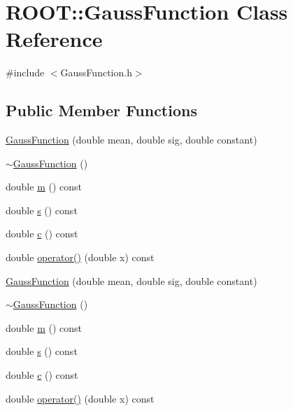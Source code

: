 \hypertarget{classROOT_1_1Minuit2_1_1GaussFunction}{}\section{R\+O\+OT\+:\+:Gauss\+Function Class Reference}
\label{classROOT_1_1Minuit2_1_1GaussFunction}


{\ttfamily \#include $<$Gauss\+Function.\+h$>$}

\subsection*{Public Member Functions}
\begin{DoxyCompactItemize}
\item 
\mbox{\hyperlink{classROOT_1_1Minuit2_1_1GaussFunction_acb3c7452d1b01833561dff721ab6e503}{Gauss\+Function}} (double mean, double sig, double constant)
\item 
\mbox{\hyperlink{classROOT_1_1Minuit2_1_1GaussFunction_a9d1701423a091b236c0bcb71bff16eac}{$\sim$\+Gauss\+Function}} ()
\item 
double \mbox{\hyperlink{classROOT_1_1Minuit2_1_1GaussFunction_a746dc27d10faf57599e9a0a5bc232a1d}{m}} () const
\item 
double \mbox{\hyperlink{classROOT_1_1Minuit2_1_1GaussFunction_aae78103bd6daf029fdb95d70185803e2}{s}} () const
\item 
double \mbox{\hyperlink{classROOT_1_1Minuit2_1_1GaussFunction_a47a6fa37ae77d53b45da55353094c79e}{c}} () const
\item 
double \mbox{\hyperlink{classROOT_1_1Minuit2_1_1GaussFunction_a5fe07f3350b17d79583af7b844ded399}{operator()}} (double x) const
\item 
\mbox{\hyperlink{classROOT_1_1Minuit2_1_1GaussFunction_acb3c7452d1b01833561dff721ab6e503}{Gauss\+Function}} (double mean, double sig, double constant)
\item 
\mbox{\hyperlink{classROOT_1_1Minuit2_1_1GaussFunction_a9d1701423a091b236c0bcb71bff16eac}{$\sim$\+Gauss\+Function}} ()
\item 
double \mbox{\hyperlink{classROOT_1_1Minuit2_1_1GaussFunction_a746dc27d10faf57599e9a0a5bc232a1d}{m}} () const
\item 
double \mbox{\hyperlink{classROOT_1_1Minuit2_1_1GaussFunction_aae78103bd6daf029fdb95d70185803e2}{s}} () const
\item 
double \mbox{\hyperlink{classROOT_1_1Minuit2_1_1GaussFunction_a47a6fa37ae77d53b45da55353094c79e}{c}} () const
\item 
double \mbox{\hyperlink{classROOT_1_1Minuit2_1_1GaussFunction_a5fe07f3350b17d79583af7b844ded399}{operator()}} (double x) const
\end{DoxyCompactItemize}


